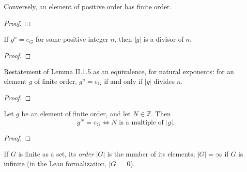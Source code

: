 \begin{proposition}
  \label{prop:groups:has-finite-order-of-order-pos}
  \leanok
  Conversely, an element of positive order has finite order.
\end{proposition}
\begin{proof}
  \leanok
\end{proof}

\begin{lemma}[II.1.5]
  \label{lem:groups:order-divisor}
  \leanok
  If $g^n = e_G$ for some positive integer $n$, then $|g|$ is a
  divisor of $n$.
\end{lemma}
\begin{proof}
  \leanok
\end{proof}

\begin{proposition}
  \label{prop:groups:gpow-eq-e-iff-order-dvd}
  \leanok
  Restatement of Lemma II.1.5 as an equivalence, for natural exponents:
  for an element $g$ of finite order, $g^n = e_G$ if and only if $|g|$
  divides $n$.
\end{proposition}
\begin{proof}
  \leanok
\end{proof}

\begin{corollary}[II.1.6]
  \label{coro:groups:order-multiple}
  \leanok
  Let $g$ be an element of finite order, and let $N \in \mathbb{Z}$.
  Then
  \[
    g^N = e_G \iff N \text{ is a multiple of } |g|.
  \]
\end{corollary}
\begin{proof}
  \leanok
\end{proof}

\begin{definition}
  \label{def:groups:order-group}
  \leanok
  If $G$ is finite as a set, its \emph{order} $|G|$ is the number of
  its elements; $|G| = \infty$ if $G$ is infinite (in the Lean
  formalization, $|G| = 0$).
\end{definition}

